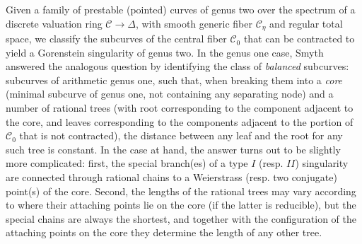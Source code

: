 \documentclass[11pt]{amsart}
\renewcommand{\to}{\rightarrow}
\newcommand{\dvr}{\Delta}
\theoremstyle{plain}
\theoremstyle{definition}
\begin{document}
Given a family of prestable (pointed) curves of genus two over the spectrum of a discrete valuation ring $\mathcal C\to\dvr$, with smooth generic fiber $\mathcal C_{\eta}$ and regular total space, we classify the subcurves of the central fiber $\mathcal C_{0}$ that can be contracted to yield a Gorenstein singularity of genus two. In the genus one case, Smyth answered the analogous question by identifying the class of \emph{balanced} subcurves: subcurves of arithmetic genus one, such that, when breaking them into a \emph{core} (minimal subcurve of genus one, not containing any separating node) and a number of rational trees (with root corresponding to the component adjacent to the core, and leaves corresponding to the components adjacent to the portion of $\mathcal C_0$ that is not contracted), the distance between any leaf and the root for any such tree is constant. In the case at hand, the answer turns out to be slightly more complicated: first, the special branch(es) of a type $I$ (resp. $I\!I$) singularity are connected through rational chains to a Weierstrass (resp. two conjugate) point(s) of the core. Second, the lengths of the rational trees may vary according to where their attaching points lie on the core (if the latter is reducible), but the special chains are always the shortest, and together with the configuration of the attaching points on the core they determine the length of any other tree.
\end{document}
